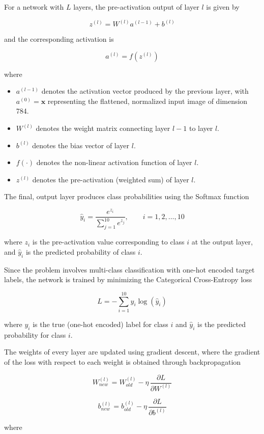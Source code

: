 \documentclass[11pt,a4paper]{article}
\begin{document}
For a network with $L$ layers, the pre-activation output of layer $l$ is given by

\[
z^{(l)} = W^{(l)} a^{(l-1)} + b^{(l)}
\]

and the corresponding activation is

\[
a^{(l)} = f\left(z^{(l)}\right)
\]

where

\begin{itemize}
\item $a^{(l-1)}$ denotes the activation vector produced by the previous layer, with $a^{(0)}=\mathbf{x}$ representing the flattened, normalized input image of dimension 784.
\item $W^{(l)}$ denotes the weight matrix connecting layer $l-1$ to layer $l$.
\item $b^{(l)}$ denotes the bias vector of layer $l$.
\item $f(\cdot)$ denotes the non-linear activation function of layer $l$.
\item $z^{(l)}$ denotes the pre-activation (weighted sum) of layer $l$.
\end{itemize}

The final, output layer produces class probabilities using the Softmax function

\[
\hat{y}_i = \frac{e^{z_i}}{\displaystyle\sum_{j=1}^{10} e^{z_j}}, \qquad i = 1,2,\dots,10
\]

where $z_i$ is the pre-activation value corresponding to class $i$ at the output layer, and $\hat{y}_i$ is the predicted probability of class $i$.

Since the problem involves multi-class classification with one-hot encoded target labels, the network is trained by minimizing the Categorical Cross-Entropy loss

\[
L = -\sum_{i=1}^{10} y_i \log(\hat{y}_i)
\]

where $y_i$ is the true (one-hot encoded) label for class $i$ and $\hat{y}_i$ is the predicted probability for class $i$.

The weights of every layer are updated using gradient descent, where the gradient of the loss with respect to each weight is obtained through backpropagation

\[
W^{(l)}_{new} = W^{(l)}_{old} - \eta \, \frac{\partial L}{\partial W^{(l)}}
\]

\[
b^{(l)}_{new} = b^{(l)}_{old} - \eta \, \frac{\partial L}{\partial b^{(l)}}
\]

where
\end{document}
